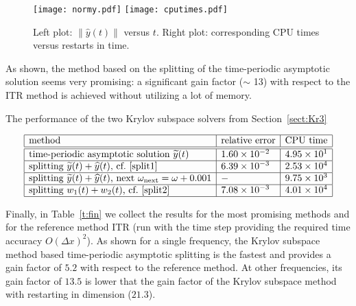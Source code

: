 \documentclass[11pt]{elsarticle}
\newcommand{\e}[1]{\times 10^{#1}}
\newcommand{\yh}{\widehat{y}}
\newcommand{\yt}{\widetilde{y}}
\begin{document}
\begin{figure}
\texttt{[image: normy.pdf]}
\texttt{[image: cputimes.pdf]}  
  \caption{Left plot: $\|\yh(t)\|$ versus $t$.  Right plot: corresponding
CPU times versus restarts in time.}
\label{fig:normy}
\end{figure}

As shown, the method based on the splitting of
the time-periodic asymptotic solution seems very promising:
a significant gain factor ($\sim$ 13) with respect to the ITR method is 
achieved without utilizing a lot of memory. 

\begin{table}
\caption{The performance of the two Krylov subspace solvers 
from Section~\ref{sect:Kr3}}
\label{t:Kr3}
\centering
\begin{equation*} 
\begin{array}{|l|l|l|} \hline
\text{method} & \text{relative error} & \text{CPU time} \\ \hline\hline
\text{time-periodic asymptotic solution $\yt(t)$} & 1.60 \e{-2} & 4.95 \e{1} \\ 
\hline
\text{splitting $\yt(t)+ \yh(t)$, cf.~\eqref{split1}} & 6.39 \e{-3} & 2.53 
\e{4} \\ \hline
\text{splitting $\yt(t)+ \yh(t)$, next $\omega_{\mathrm{next}}=\omega+0.001$} & 
- & 9.75 \e{3} \\ \hline
\text{splitting $w_1(t)+ w_2(t)$, cf.~\eqref{split2}} & 7.08 \e{-3} & 4.01 
\e{4} \\ \hline
\end{array}
\end{equation*}
\end{table}

Finally, in Table~\ref{t:fin} we collect the results for the most
promising methods and for the reference method ITR (run 
with the time step providing the required time accuracy 
$O(\Delta x)^2$).
As shown for a single frequency, the Krylov subspace method
based  time-periodic asymptotic splitting is the fastest
and provides a gain factor of $5.2$ with respect to the 
reference method.  At other frequencies, its gain
factor of $13.5$ is lower that the gain factor of the 
Krylov subspace method with restarting in dimension ($21.3$).
\end{document}

